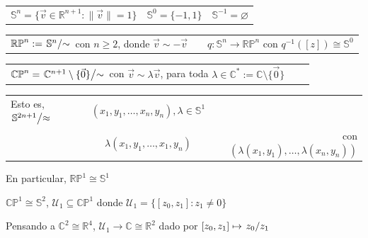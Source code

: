 \begin{tcolorbox}[colback=white!15!white,colframe=red!75!black,title=\textbf{Espacios}]
        \begin{tabular}{lcr}
            \index{esfera de dimensión \(n\)}\(\mathbb{S}^{n}=\{\vec{v}\in\mathbb{R}^{n+1} : \|\vec{v}\|=1\}\) & \(\mathbb{S}^{0}=\{-1, 1\}\) & \(\mathbb{S}^{-1}=\varnothing\)\\
        \end{tabular}

\vs
        \begin{tabular}{lcr}
            \index{espacio proyectivo real}\(\mathbb{RP}^{n}:=\left.\mathbb{S}^{n}\middle/\sim\right.\) 
            con \(n\geq 2\), donde \(\vec{v}\sim -\vec{v}\) & & \(q\colon\mathbb{S}^{n}\to\mathbb{RP}^{n}\) 
            con \(q^{-1}([z])\cong\mathbb{S}^{0}\) \\
        \end{tabular}

\vs
        \begin{tabular}{lcr}
            \index{espacio proyectivo complejo}\(\mathbb{CP}^{n}=\left.\mathbb{C}^{n+1}\setminus\{\vec{0}\}\middle/\sim\right.\) con \(\vec{v}\sim\lambda\vec{v}\), para toda \(\lambda\in\mathbb{C}^{*}:=\mathbb{C}\setminus\{\vec{0}\}\) & & \\
        \end{tabular}

        \begin{tabular}{lcr}
            Esto es, \(\left.\mathbb{S}^{2n+1}\middle/\approx\right.\) & \((x_1, y_1, \dots, x_n, y_n), \lambda\in\mathbb{S}^{1}\) & \\
            & \(\lambda(x_1, y_1, \dots, x_1, y_n)\) & con \((\lambda(x_1, y_1), \dots, \lambda(x_n, y_n))\)\\
        \end{tabular}

    \tcblower 
    En particular, \(\mathbb{RP}^{1}\cong\mathbb{S}^{1}\) 
    
    \(\mathbb{CP}^{1}\cong \mathbb{S}^{2}\), \(\mathcal{U}_{1}\subseteq \mathbb{CP}^{1}\) donde \(\mathcal{U}_{1}=\{[z_{0}, z_{1}] : z_{1}\neq 0\}\)
    
    Pensando a \(\mathbb{C}^{2}\cong\mathbb{R}^{4}\), \(\mathcal{U}_{1}\to \mathbb{C}\cong\mathbb{R}^{2}\) dado por \([z_0, z_1]\mapsto \left.z_0\middle/z_1\right.\)
\end{tcolorbox}


